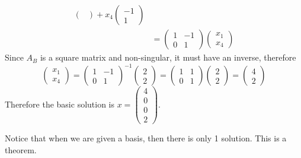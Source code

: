 \begin{problem}[]
\begin{align*}
\begin{pmatrix}
                                \end{pmatrix} + x_4 \begin{pmatrix}
                                                        -1 \\ 1
                                                    \end{pmatrix} \tag*{Since $x$ is a basic solution, $x_2 = x_3 = 0$} \\
                        & = \begin{pmatrix}
                                1 & -1 \\
                                0 & 1
                            \end{pmatrix} \begin{pmatrix}
                                              x_1 \\ x_4
                                          \end{pmatrix}
    \end{align*}
    Since $A_B$ is a square matrix and non-singular, it must have an inverse, therefore $$\begin{pmatrix}
            x_1 \\ x_4
        \end{pmatrix} = \begin{pmatrix}
            1 & -1 \\
            0 & 1
        \end{pmatrix}^{-1} \begin{pmatrix}
            2 \\ 2
        \end{pmatrix} = \begin{pmatrix}
            1 & 1 \\
            0 & 1
        \end{pmatrix} \begin{pmatrix}
            2 \\ 2
        \end{pmatrix} = \begin{pmatrix}
            4 \\ 2
        \end{pmatrix}$$
    Therefore the basic solution is $x = \begin{pmatrix}
            4 \\ 0 \\ 0 \\ 2
        \end{pmatrix}$.
    
    \bigskip
    Notice that when we are given a basis, then there is only 1 solution. This is a theorem.
    \end{problem}
